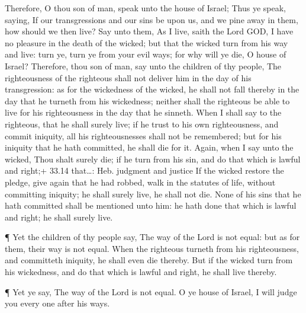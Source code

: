  Therefore, O thou son of man, speak unto the house of
Israel; Thus ye speak, saying, If our transgressions and our sins be
upon us, and we pine away in them, how should we then live?
 Say unto them, As I live, saith the Lord GOD, I have no
pleasure in the death of the wicked; but that the wicked turn from his
way and live: turn ye, turn ye from your evil ways; for why will ye die,
O house of Israel?  Therefore, thou son of man, say unto
the children of thy people, The righteousness of the righteous shall not
deliver him in the day of his transgression: as for the wickedness of
the wicked, he shall not fall thereby in the day that he turneth from
his wickedness; neither shall the righteous be able to live for his
righteousness in the day that he sinneth.  When I shall say
to the righteous, that he shall surely live; if he trust to his own
righteousness, and commit iniquity, all his righteousnesses shall not be
remembered; but for his iniquity that he hath committed, he shall die
for it.  Again, when I say unto the wicked, Thou shalt
surely die; if he turn from his sin, and do that which is lawful and
right;+ 33.14 that\ldots: Heb. judgment and justice  If the
wicked restore the pledge, give again that he had robbed, walk in the
statutes of life, without committing iniquity; he shall surely live, he
shall not die.  None of his sins that he hath committed
shall be mentioned unto him: he hath done that which is lawful and
right; he shall surely live.

 ¶ Yet the children of thy people say, The way of the Lord
is not equal: but as for them, their way is not equal. 
When the righteous turneth from his righteousness, and committeth
iniquity, he shall even die thereby.  But if the wicked
turn from his wickedness, and do that which is lawful and right, he
shall live thereby.

 ¶ Yet ye say, The way of the Lord is not equal. O ye house
of Israel, I will judge you every one after his ways.

